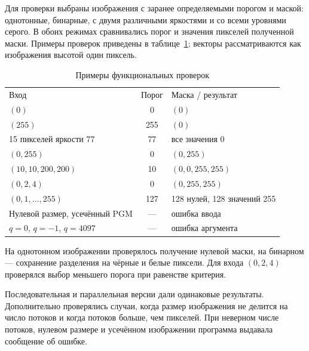 Для проверки выбраны изображения с заранее определяемыми порогом и маской: однотонные, бинарные, с двумя различными яркостями и со всеми уровнями серого. В обоих режимах сравнивались порог и значения пикселей полученной маски. Примеры проверок приведены в таблице~\ref{tab:tests}; векторы рассматриваются как изображения высотой один пиксель.
\begin{table}[H]\caption{Примеры функциональных проверок}\label{tab:tests}
\centering\begin{tabularx}{\textwidth}{|X|c|X|}\hline
Вход & Порог & Маска / результат\\\hhline{|=:=:=|}
$(0)$ & 0 & $(0)$\\\hline
$(255)$ & 255 & $(0)$\\\hline
15 пикселей яркости 77 & 77 & все значения 0\\\hline
$(0,255)$ & 0 & $(0,255)$\\\hline
$(10,10,200,200)$ & 10 & $(0,0,255,255)$\\\hline
$(0,2,4)$ & 0 & $(0,255,255)$\\\hline
$(0,1,\ldots,255)$ & 127 & 128 нулей, 128 значений 255\\\hline
Нулевой размер, усечённый PGM & --- & ошибка ввода\\\hline
$q=0$, $q=-1$, $q=4097$ & --- & ошибка аргумента\\\hline
\end{tabularx}\end{table}

На однотонном изображении проверялось получение нулевой маски, на бинарном --- сохранение разделения на чёрные и белые пиксели. Для входа $(0,2,4)$ проверялся выбор меньшего порога при равенстве критерия.

Последовательная и параллельная версии дали одинаковые результаты. Дополнительно проверялись случаи, когда размер изображения не делится на число потоков и когда потоков больше, чем пикселей. При неверном числе потоков, нулевом размере и усечённом изображении программа выдавала сообщение об ошибке.
